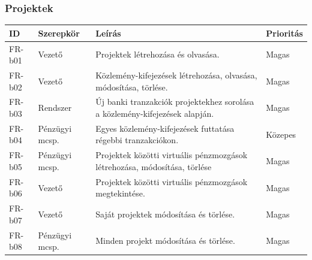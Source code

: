\documentclass[a4paper,12pt]{article}
\begin{document}
\subsubsection{Projektek}
\begin{table}[H]
  \centering
  \begin{tabular}{llL{8.5cm}l}
  \toprule
  ID & Szerepkör & Leírás & Prioritás \\
  \midrule
  FR-b01 & Vezető           & Projektek létrehozása és olvasása.                                                        & Magas   \\
  FR-b02 & Vezető           & Közlemény-kifejezések létrehozása, olvasása, módosítása, törlése.                         & Magas   \\
  FR-b03 & Rendszer         & Új banki tranzakciók projektekhez sorolása a közlemény-kifejezések alapján.               & Magas   \\
  FR-b04 & Pénzügyi mcsp.   & Egyes közlemény-kifejezések futtatása régebbi tranzakciókon.                              & Közepes \\
  FR-b05 & Pénzügyi mcsp.   & Projektek közötti virtuális pénzmozgások létrehozása, módosítása, törlése                 & Magas   \\
  FR-b06 & Vezető           & Projektek közötti virtuális pénzmozgások megtekintése.                                    & Magas   \\
  FR-b07 & Vezető           & Saját projektek módosítása és törlése.                                                    & Magas   \\
  FR-b08 & Pénzügyi mcsp.   & Minden projekt módosítása és törlése.                                                     & Magas   \\
  \bottomrule
  \end{tabular}
\end{table}
\end{document}

